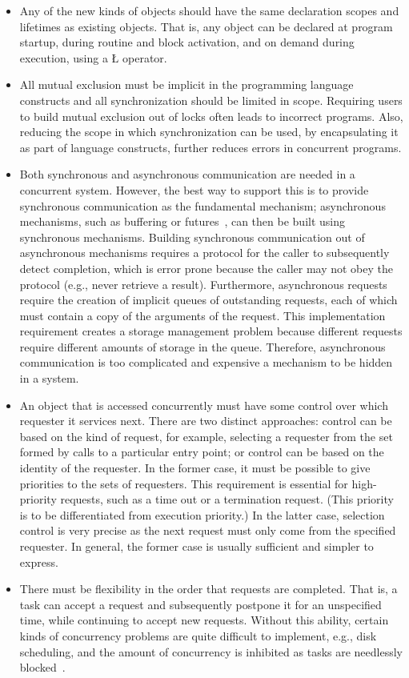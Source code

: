 \documentclass[openright,twoside]{report}
\begin{document}
\begin{itemize}
\item
Any of the new kinds of objects should have the same declaration scopes and lifetimes as existing objects.
That is, any object can be declared at program startup, during routine and block activation, and on demand during execution, using a \LGinlinetrue\LGbegin\lgrinde\L{}\endlgrinde\LGend{} operator.

\item
All mutual exclusion must be implicit in the programming language constructs and all synchronization should be limited in scope.
Requiring users to build mutual exclusion out of locks often leads to incorrect programs.
Also, reducing the scope in which synchronization can be used, by encapsulating it as part of language constructs, further reduces errors in concurrent programs.

\item
Both synchronous and asynchronous communication are needed in a concurrent system.
However, the best way to support this is to provide synchronous communication as the fundamental mechanism;
asynchronous mechanisms, such as buffering or futures~\cite{multilisp}, can then be built using synchronous mechanisms.
Building synchronous communication out of asynchronous mechanisms requires a protocol for the caller to subsequently detect completion, which is error prone because the caller may not obey the protocol (e.g., never retrieve a result).
Furthermore, asynchronous requests require the creation of implicit queues of outstanding requests, each of which must contain a copy of the arguments of the request.
This implementation requirement creates a storage management problem because different requests require different amounts of storage in the queue.
Therefore, asynchronous communication is too complicated and expensive a mechanism to be hidden in a system.

\item
An object that is accessed concurrently must have some control over which requester it services next.
There are two distinct approaches:
control can be based on the kind of request, for example, selecting a requester from the set formed by calls to a particular entry point; or control can be based on the identity of the requester.
In the former case, it must be possible to give priorities to the sets of requesters.
This requirement is essential for high-priority requests, such as a time out or a termination request.
(This priority is to be differentiated from execution priority.)
In the latter case, selection control is very precise as the next request must only come from the specified requester.
In general, the former case is usually sufficient and simpler to express.

\item
There must be flexibility in the order that requests are completed.
That is, a task can accept a request and subsequently postpone it for an unspecified time, while continuing to accept new requests.
Without this ability, certain kinds of concurrency problems are quite difficult to implement, e.g., disk scheduling, and the amount of concurrency is inhibited as tasks are needlessly blocked~\cite{Gentleman81}.
\end{itemize}
\end{document}
